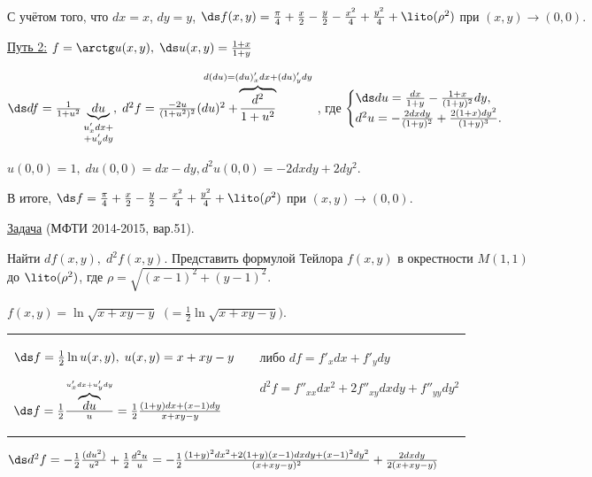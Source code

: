 С учётом того, что \;$dx=x$, \; $dy=y$, \; $\ds f(x,y) = \frac{\pi}{4} + \frac{x}{2} - \frac{y}{2} - \frac{x^2}{4} + \frac{y^2}{4} + \lito(\rho^2)$ \; при \; $(x,y)\to (0,0)$.

\underline{Путь 2:} \; $f = \arctg u(x,y), \; \ds u(x,y)=\frac{1+x}{1+y}$

$\ds df = \frac{1}{1+u^2}\underbrace{\;du\;}_{\substack {u'_xdx+\\+u'_ydy}}, \; d^2f = \frac{-2u}{(1+u^2)^2}(du)^2 + \!\!\!\!\!\!\!\!\!\!\!\!\!\!\!\!\!\! \overbrace{\frac{d^2}{1+u^2}}^{d(du)=(du)'_xdx + (du)'_ydy}$ \!\!\!\!\!\!\!\!\!\!\!\!\!\!\!\!\!\!, где \;
 $\begin{cases}
   \ds du = \frac{dx}{1+y} - \frac{1+x}{(1+y)^2}dy,   
   \\
   d^2u = -\frac{2dxdy}{(1+y)^2} + \frac{2(1+x)dy^2}{(1+y)^3}.
 \end{cases}$
 
 $u(0,0) = 1, \; du(0,0) = dx - dy, d^2u(0,0) = -2dxdy + 2dy^2$.
 
 В итоге, $ \ds f = \frac{\pi}{4} + \frac{x}{2} - \frac{y}{2} - \frac{x^2}{4} + \frac{y^2}{4} + \lito(\rho^2)$ при $(x,y) \to (0,0)$.
 
\bigskip

\bigskip

\underline{Задача} \; (МФТИ 2014-2015, вар.51).

Найти $df(x,y), \; d^2f(x,y)$. \; Представить формулой Тейлора $f(x,y)$ в окрестности $M(1,1)$ \\ до \; $\lito(\rho^2)$, \; где \; $\rho = \sqrt{(x-1)^2+(y-1)^2}$.
\begin{center}
$f(x,y)=\ln{\sqrt{x+xy-y}} \; \; \bigg(\!= \frac{1}{2}\ln{\sqrt{x+xy-y}}\bigg)$.
\end{center}

\begin{table}[ht]
  \centering
  \begin{tabular}{p{8cm} c p{8cm}}
    $\ds f = \frac{1}{2}\ln{u(x,y)}, \; u(x,y) = x + xy - y$

$\ds f = \frac{1}{2}\frac{\overbrace{du}^{u'_xdx+u'_ydy}}{u} = \frac{1}{2}\frac{(1+y)dx+(x-1)dy}{x+xy-y}$ & \hfill & либо $df=f'_xdx+f'_ydy$

\smallskip

$d^2f=f''_{xx}dx^2+2f''_{xy}dxdy+f''_{yy}dy^2$
  \end{tabular}
\end{table}

$\ds d^2f = -\frac{1}{2}\frac{(du^2)}{u^2} + \frac{1}{2}\frac{d^2u}{u} = -\frac{1}{2}\frac{(1+y)^2dx^2+2(1+y)(x-1)dxdy+(x-1)^2dy^2}{(x+xy-y)^2} + \frac{2dxdy}{2(x+xy-y)}$


